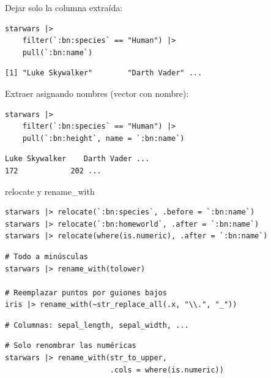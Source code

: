 \documentclass[8pt]{beamer}
\begin{document}
\begin{frame}[fragile]
Dejar solo la columna extraída:
\begin{lstlisting}[style=RScript]
starwars |>
	filter(`:bn:species` == "Human") |>
	pull(`:bn:name`)
\end{lstlisting}
\begin{lstlisting}[style=RConsole]
[1] "Luke Skywalker"        "Darth Vader" ...
\end{lstlisting}

Extraer asignando nombres (vector con nombre):
\begin{lstlisting}[style=RScript]
starwars |>
	filter(`:bn:species` == "Human") |>
	pull(`:bn:height`, name = `:bn:name`)
\end{lstlisting}
\begin{lstlisting}[style=RConsole]
Luke Skywalker    Darth Vader ...
172            202 ...
\end{lstlisting}
\end{frame}





\begin{frame}[fragile]{relocate y rename\_with}
\begin{lstlisting}[style=RScript]
starwars |> relocate(`:bn:species`, .before = `:bn:name`)
starwars |> relocate(`:bn:homeworld`, .after = `:bn:name`)
starwars |> relocate(where(is.numeric), .after = `:bn:name`)
\end{lstlisting}

\begin{lstlisting}[style=RScript]
# Todo a minúsculas
starwars |> rename_with(tolower)

# Reemplazar puntos por guiones bajos
iris |> rename_with(~str_replace_all(.x, "\\.", "_"))
\end{lstlisting}
\begin{lstlisting}[style=RConsole]
# Columnas: sepal_length, sepal_width, ...
\end{lstlisting}
\begin{lstlisting}[style=RScript]
# Solo renombrar las numéricas
starwars |> rename_with(str_to_upper,
                        .cols = where(is.numeric))
\end{lstlisting}
\end{frame}
\end{document}

